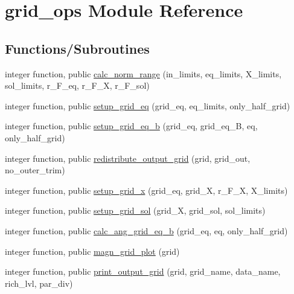 \hypertarget{namespacegrid__ops}{}\section{grid\+\_\+ops Module Reference}
\label{namespacegrid__ops}
\subsection*{Functions/\+Subroutines}
\begin{DoxyCompactItemize}
\item 
integer function, public \hyperlink{namespacegrid__ops_a596695cab6971ec6b9d32d13a50708b6}{calc\+\_\+norm\+\_\+range} (in\+\_\+limits, eq\+\_\+limits, X\+\_\+limits, sol\+\_\+limits, r\+\_\+\+F\+\_\+eq, r\+\_\+\+F\+\_\+X, r\+\_\+\+F\+\_\+sol)
\item 
integer function, public \hyperlink{namespacegrid__ops_ab749b0904ed8c69253fe8908c2624bcd}{setup\+\_\+grid\+\_\+eq} (grid\+\_\+eq, eq\+\_\+limits, only\+\_\+half\+\_\+grid)
\item 
integer function, public \hyperlink{namespacegrid__ops_ad16495ddd320562451c2325bafecf2d8}{setup\+\_\+grid\+\_\+eq\+\_\+b} (grid\+\_\+eq, grid\+\_\+eq\+\_\+B, eq, only\+\_\+half\+\_\+grid)
\item 
integer function, public \hyperlink{namespacegrid__ops_ab10ef5b486ee3861df2da4e53bc22630}{redistribute\+\_\+output\+\_\+grid} (grid, grid\+\_\+out, no\+\_\+outer\+\_\+trim)
\item 
integer function, public \hyperlink{namespacegrid__ops_a1047889ec84da6e56aae619570a16988}{setup\+\_\+grid\+\_\+x} (grid\+\_\+eq, grid\+\_\+X, r\+\_\+\+F\+\_\+X, X\+\_\+limits)
\item 
integer function, public \hyperlink{namespacegrid__ops_ae4f50f7b63e0a8b84dae6b98fd3e5d71}{setup\+\_\+grid\+\_\+sol} (grid\+\_\+X, grid\+\_\+sol, sol\+\_\+limits)
\item 
integer function, public \hyperlink{namespacegrid__ops_a06107dbdfd1dd62e372cc29ab0255bad}{calc\+\_\+ang\+\_\+grid\+\_\+eq\+\_\+b} (grid\+\_\+eq, eq, only\+\_\+half\+\_\+grid)
\item 
integer function, public \hyperlink{namespacegrid__ops_addd76b7b3be0b51e0863ae0cdfef41e6}{magn\+\_\+grid\+\_\+plot} (grid)
\item 
integer function, public \hyperlink{namespacegrid__ops_ab2a8efa54d36500efcabeb9f1aabbcc6}{print\+\_\+output\+\_\+grid} (grid, grid\+\_\+name, data\+\_\+name, rich\+\_\+lvl, par\+\_\+div)
\end{DoxyCompactItemize}
